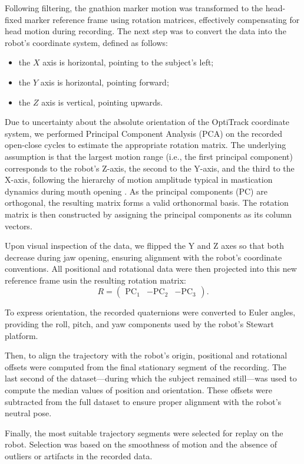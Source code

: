Following filtering, the gnathion marker motion was transformed to the head-fixed marker reference frame using rotation matrices, effectively compensating 
for head motion during recording. The next step was to convert the data into the robot's coordinate system, defined as follows:
\begin{itemize}[nosep]
    \item the $X$ axis is horizontal, pointing to the subject's left;
    \item the $Y$ axis is horizontal, pointing forward;
    \item the $Z$ axis is vertical, pointing upwards.
\end{itemize}
Due to uncertainty about the absolute orientation of the OptiTrack coordinate system, we performed Principal Component Analysis (PCA) on the recorded open-close 
cycles to estimate the appropriate rotation matrix. The underlying assumption is that the largest motion range (i.e., the first principal component)
corresponds to the robot's Z-axis, the second to the Y-axis, and the third to the X-axis, following the hierarchy of motion amplitude typical in mastication 
dynamics during mouth opening \cite{mouth_opening_mvt}. As the principal components (PC) are orthogonal, the resulting matrix forms a valid orthonormal basis. The rotation matrix is 
then constructed by assigning the principal components as its column vectors.

Upon visual inspection of the data, we flipped the Y and Z axes so that both decrease during jaw opening, ensuring alignment with the robot's coordinate 
conventions. All positional and rotational data were then projected into this new reference frame usin the resulting rotation matrix:
\[
R = \begin{pmatrix}
    \text{PC}_1 & -\text{PC}_2 & -\text{PC}_3
\end{pmatrix}.
\]

To express orientation, the recorded quaternions were converted to Euler angles, providing the roll, pitch, and yaw components used by the robot's 
Stewart platform.

Then, to align the trajectory with the robot's origin, positional and rotational offsets were computed from the final stationary segment of the 
recording. The last second of the dataset—during which the subject remained still—was used to compute the median values of position and orientation. 
These offsets were subtracted from the full dataset to ensure proper alignment with the robot's neutral pose.

Finally, the most suitable trajectory segments were selected for replay on the robot. Selection was based on the 
smoothness of motion and the absence of outliers or artifacts in the recorded data.






